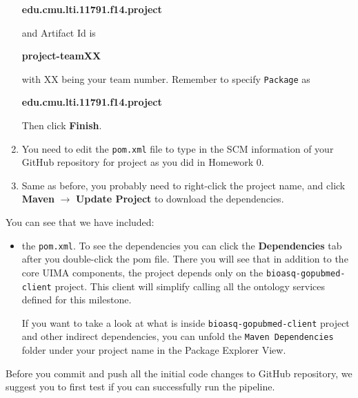 \begin{enumerate}
\begin{center}
\textbf{edu.cmu.lti.11791.f14.project}
\end{center}

and Artifact Id is

\begin{center}
\textbf{project-teamXX}
\end{center}

with XX being your team number. Remember to specify \texttt{Package} as

\begin{center}
\textbf{edu.cmu.lti.11791.f14.project}
\end{center}

Then click \textbf{Finish}.


\item You need to edit the \texttt{pom.xml} file to type in the SCM information
of your GitHub repository for project as you did in Homework 0.

\item Same as before, you probably need to right-click the project name, and
click \textbf{Maven} $\rightarrow$ \textbf{Update Project} to download the
dependencies.

\end{enumerate}

You can see that we have included:

\begin{itemize}

\item the \texttt{pom.xml}. To see the dependencies you can click the \textbf{Dependencies} tab after you double-click the pom file. There you will see that in addition to the core UIMA components, the project depends only on the \texttt{bioasq-gopubmed-client} project. This client will simplify calling all the ontology services defined for this milestone.

If you want to take a look at what is inside \texttt{bioasq-gopubmed-client} project and
other indirect dependencies, you can unfold the \texttt{Maven Dependencies}
folder under your project name in the Package Explorer View.
\end{itemize}

Before you commit and push all the initial code changes to GitHub repository, we
suggest you to first test if you can successfully run the pipeline.
\begin{comment}

\begin{enumerate}
item Right-click this file in the Package Explorer View, and then click
\textbf{Run As} $\rightarrow$ \textbf{hellobioqa}. Wait until all 28 questions
are processed, and the evaluation results are printed to the console, and you
find no exceptions are thrown.
\item Now, other team members are able to clone the repository to their workspaces and start working on particular task. When you are asked to \textbf{Select a wizard to use for importing projects}, don't forget to select \textbf{Import existing projects} as long as your team leader commited .project and .classth to the repository.
\end{enumerate}
\end{comment}
